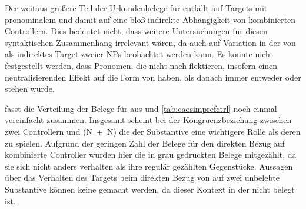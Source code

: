 Der weitaus größere Teil der Urkundenbelege für  entfällt auf
Targets mit pro\-nomi\-nalem  und damit auf eine bloß indirekte
Abhängigkeit von kombinierten Controllern. Dies bedeutet nicht, dass weitere
Untersuchungen für diesen syntaktischen Zusammenhang irrelevant wären, da auch
auf  Variation in der  von  als
indirektes Target zweier NPs beobachtet werden kann. Es konnte nicht
festgestellt werden, dass Pronomen, die nicht nach  flektieren,
insofern einen neutralisierenden Effekt auf die Form von  haben,
als danach immer entweder  oder  stehen würde.

 fasst die Verteilung
der Belege für  aus  und
\ref{tab:caosimprefctrl} noch einmal vereinfacht zusammen. Insgesamt scheint
bei der Kongruenzbeziehung zwischen zwei
Controllern und  (N~+~N) die
 der Substantive eine wichtigere Rolle als deren
 zu spielen. Aufgrund der geringen Zahl der Belege für den direkten
Bezug auf kombinierte Controller wurden hier die in 
grau gedruckten Belege mitgezählt, da sie sich nicht anders verhalten als ihre
regulär gezählten Gegenstücke. Aussagen über das Verhalten des Targets beim
direkten Bezug von  auf zwei unbelebte Substantive
können keine gemacht werden, da dieser Kontext in der  nicht
belegt ist.

